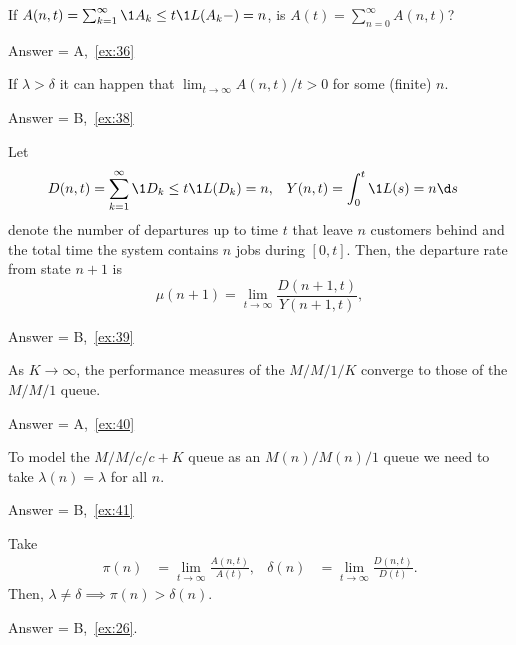 \begin{exercise}[201904]
 If $A(n,t) = \sum_{k=1}^\infty \1{A_k \leq t}\1{L(A_k-) = n}$, is $A(t) =\sum_{n=0}^\infty A(n,t)$?
\begin{solution} Answer = A,~\cref{ex:36}
\end{solution}
\end{exercise}

\begin{exercise}[201904]
If $\lambda>\delta$ it can happen that $ \lim_{t\to\infty} A(n,t)/t > 0$ for some (finite) $n$. 
\begin{solution} Answer = B,~\cref{ex:38}
\end{solution}
\end{exercise}

\begin{exercise}[201904]
Let
\begin{align*}
 D(n,t) &= \sum_{k=1}^\infty \1{D_k \leq t} \1{L(D_k) = n}, & Y(n,t) &= \int_0^t \1{L(s) = n} \d s
 \end{align*}
 denote the number of departures up to time $t$ that leave $n$ customers behind and the total time the system contains $n$ jobs during $[0,t]$.
 Then, the departure rate from state $n+1$ is
\begin{equation*}
 \mu(n+1) = \lim_{t\to\infty} \frac{D(n+1,t)}{Y(n+1,t)},
\end{equation*}
\begin{solution} Answer = B,~\cref{ex:39}
\end{solution}
\end{exercise}



\begin{exercise}[201904] 
As $K\to\infty$, the performance measures of the $M/M/1/K$ converge to those of the $M/M/1$ queue. 
\begin{solution} Answer = A,~\cref{ex:40}
\end{solution}
\end{exercise}


\begin{exercise}[201904] 
To model the $M/M/c/c+K$ queue as an $M(n)/M(n)/1$ queue we need to take $\lambda(n) = \lambda$ for all $n$.
\begin{solution} Answer = B,~\cref{ex:41}
\end{solution}
\end{exercise}

\newpage

\begin{exercise}[201904]
 Take
 \begin{align*}
 \pi(n) &= \lim_{t\to\infty} \frac{A(n,t)}{A(t)}, & 
 \delta(n) &= \lim_{t\to\infty} \frac{D(n,t)}{D(t)}. 
 \end{align*}
 Then, $\lambda\neq \delta \implies \pi(n) > \delta(n)$.
\begin{solution} Answer = B,~\cref{ex:26}.
\end{solution}
\end{exercise}

